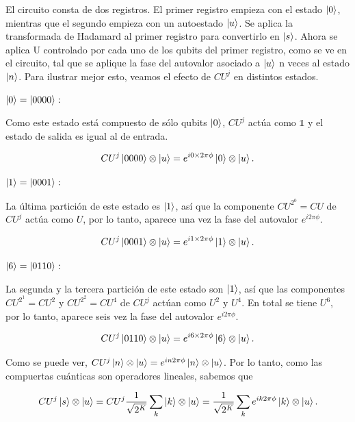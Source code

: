 El circuito consta de dos registros. El primer registro empieza con el estado $\ket{0}$, mientras que el segundo empieza con un autoestado $\ket{u}$. Se aplica la transformada de Hadamard al primer registro para convertirlo en $\ket{s}$. Ahora se aplica U controlado por cada uno de los qubits del primer registro, como se ve en el circuito, tal que se aplique la fase del autovalor asociado a $\ket{u}$ n veces al estado $\ket{n}$. Para ilustrar mejor esto, veamos el efecto de $CU^j$ en distintos estados.

$\ket{0} = \ket{0000}:$

Como este estado está compuesto de sólo qubits $\ket{0}$, $CU^j$ actúa como $\mathds{1}$ y el estado de salida es igual al de entrada.

\begin{equation}
    CU^j \ket{0000} \otimes \ket{u} = e^{i 0 \times 2\pi \phi} \ket{0} \otimes \ket{u} .
\end{equation}

$\ket{1} = \ket{0001}:$

La última partición de este estado es $\ket{1}$, así que la componente $CU^{2^0} = CU$ de $CU^j$ actúa como $U$, por lo tanto, aparece una vez la fase del autovalor $e^{i 2\pi \phi}$.

\begin{equation}
    CU^j \ket{0001} \otimes \ket{u} = e^{i 1 \times 2\pi \phi} \ket{1} \otimes \ket{u} .
\end{equation}

$\ket{6} = \ket{0110}:$

La segunda y la tercera partición de este estado son $\ket{1}$, así que las componentes $CU^{2^1} = CU^2$ y $CU^{2^2} = CU^4$ de $CU^j$ actúan como $U^2$ y $U^4$. En total se tiene $U^6$, por lo tanto, aparece seis vez la fase del autovalor $e^{i 2\pi \phi}$.

\begin{equation}
    CU^j \ket{0110} \otimes \ket{u} = e^{i 6 \times 2\pi \phi} \ket{6} \otimes \ket{u} .
\end{equation}

Como se puede ver, $CU^j \ket{n} \otimes \ket{u} = e^{i n 2\pi \phi} \ket{n} \otimes \ket{u}$. Por lo tanto, como las compuertas cuánticas son operadores lineales, sabemos que

\begin{equation}
    CU^j \ket{s} \otimes \ket{u} = CU^j \frac{1}{\sqrt{2^K}} \sum\limits_k \ket{k} \otimes \ket{u} = \frac{1}{\sqrt{2^K}} \sum\limits_k e^{i k 2\pi \phi} \ket{k} \otimes \ket{u} .
\end{equation}

